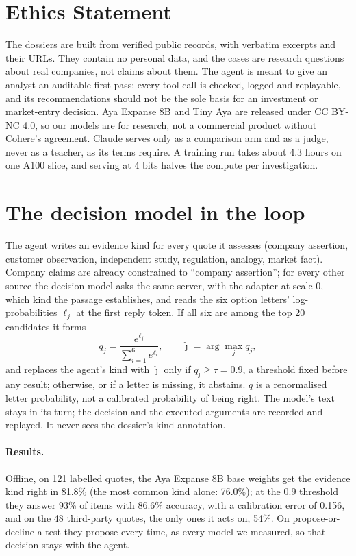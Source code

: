 \documentclass[11pt]{article}
\begin{document}
\section*{Ethics Statement}

The dossiers are built from verified public records, with verbatim excerpts and their URLs. They contain no personal data, and the cases are research questions about
real companies, not claims about them. The agent is meant to give an analyst an auditable first pass: every tool call is
checked, logged and replayable, and its recommendations should not be the sole basis for an investment or market-entry
decision. Aya Expanse 8B and Tiny Aya are released under CC BY-NC 4.0, so our models are for research, not a commercial
product without Cohere's agreement. Claude serves only as a comparison arm and as a judge, never as a teacher, as its
terms require. A training run takes about 4.3 hours on one A100 slice, and serving at 4 bits halves the compute per
investigation.



\appendix

\section{The decision model in the loop}
\label{app:decide}

The agent writes an evidence kind for every quote it assesses (company assertion, customer observation, independent
study, regulation, analogy, market fact). Company claims are already constrained to ``company assertion''; for every
other source the decision model asks the same server, with the adapter at scale 0, which kind the passage
establishes, and reads the six option letters' log-probabilities $\ell_j$ at the first reply token. If all six are
among the top 20 candidates it forms
\begin{equation}
q_j = \frac{e^{\ell_j}}{\sum_{i=1}^{6} e^{\ell_i}}, \qquad \hat{\jmath} = \arg\max_j q_j,
\end{equation}
and replaces the agent's kind with $\hat{\jmath}$ only if $q_{\hat{\jmath}} \ge \tau = 0.9$, a threshold fixed before any
result; otherwise, or if a letter is missing, it abstains. $q$ is a renormalised letter probability, not a calibrated
probability of being right. The model's text stays in its turn; the decision and the executed arguments
are recorded and replayed. It never sees the dossier's kind annotation.


\paragraph{Results.} Offline, on 121 labelled quotes, the Aya Expanse 8B base weights get the evidence kind right in 81.8\% (the most common
kind alone: 76.0\%); at the 0.9 threshold they answer 93\% of items with 86.6\% accuracy, with a calibration error of
0.156, and on the 48 third-party quotes, the only ones it acts on, 54\%. On propose-or-decline a test they propose
every time, as every model we measured, so that decision stays with the agent.
\end{document}
